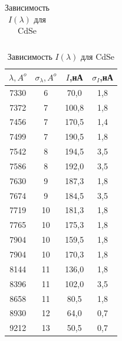 \documentclass[a4paper,12pt]{report}
\begin{document}
\begin{table}[H]
\begin{center}
\begin{tabular}{|c|c|c|c|}
\end{tabular}
\hspace{1cm}
\begin{tabular}{|c|c|c|c|}
\hline
$\lambda, A^{o}$ & $\sigma_{\lambda}, A^{o}$ & $I$,нА & $\sigma_{I}$,нА \\ \hline
7330      & 6               & 70,0                        & 1,8                              \\ \hline
7372      & 7               & 100,8                       & 1,8                              \\ \hline
7456      & 7               & 170,5                       & 1,4                              \\ \hline
7499      & 7               & 190,5                       & 1,8                              \\ \hline
7542      & 8               & 194,5                       & 3,5                              \\ \hline
7586      & 8               & 192,0                       & 3,5                              \\ \hline
7630      & 9               & 187,3                       & 1,8                              \\ \hline
7674      & 9               & 184,5                       & 3,5                              \\ \hline
7719      & 10              & 181,3                       & 1,8                              \\ \hline
7765      & 10              & 175,3                       & 1,8                              \\ \hline
7904      & 10              & 159,5                       & 1,8                              \\ \hline
7904      & 10              & 170,3                       & 1,8                              \\ \hline
8144      & 11              & 136,0                       & 1,8                              \\ \hline
8396      & 11              & 102,0                       & 3,5                              \\ \hline
8658      & 11              & 80,5                        & 1,8                              \\ \hline
8930      & 12              & 64,0                        & 0,7                              \\ \hline
9212      & 13              & 50,5                        & 0,7                              \\ \hline
\end{tabular}
\caption{Зависимость $I(\lambda)$ для CdSe}
\end{center}
\end{table}
\end{document}
